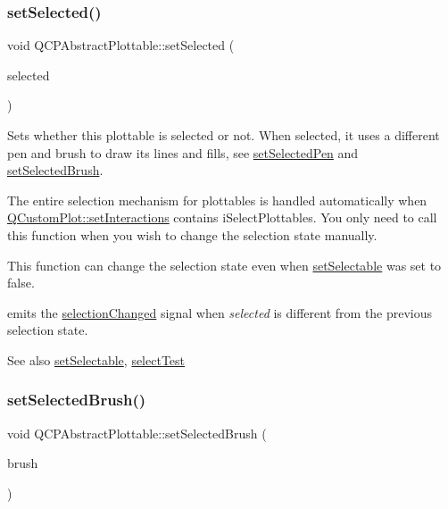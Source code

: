 \subsubsection{\texorpdfstring{set\+Selected()}{setSelected()}}
{\footnotesize\ttfamily void Q\+C\+P\+Abstract\+Plottable\+::set\+Selected (\begin{DoxyParamCaption}\item[{bool}]{selected }\end{DoxyParamCaption})}

Sets whether this plottable is selected or not. When selected, it uses a different pen and brush to draw its lines and fills, see \hyperlink{class_q_c_p_abstract_plottable_a6911603cad23ab0469b108224517516f}{set\+Selected\+Pen} and \hyperlink{class_q_c_p_abstract_plottable_ae8c816874089f7a44001e8618e81a9dc}{set\+Selected\+Brush}.

The entire selection mechanism for plottables is handled automatically when \hyperlink{class_q_custom_plot_a5ee1e2f6ae27419deca53e75907c27e5}{Q\+Custom\+Plot\+::set\+Interactions} contains i\+Select\+Plottables. You only need to call this function when you wish to change the selection state manually.

This function can change the selection state even when \hyperlink{class_q_c_p_abstract_plottable_a22c69299eb5569e0f6bf084877a37dc4}{set\+Selectable} was set to false.

emits the \hyperlink{class_q_c_p_abstract_plottable_a3af66432b1dca93b28e00e78a8c7c1d9}{selection\+Changed} signal when {\itshape selected} is different from the previous selection state.

\begin{DoxySeeAlso}{See also}
\hyperlink{class_q_c_p_abstract_plottable_a22c69299eb5569e0f6bf084877a37dc4}{set\+Selectable}, \hyperlink{class_q_c_p_abstract_plottable_a38efe9641d972992a3d44204bc80ec1d}{select\+Test} 
\end{DoxySeeAlso}
\hypertarget{class_q_c_p_abstract_plottable_ae8c816874089f7a44001e8618e81a9dc}{}\label{class_q_c_p_abstract_plottable_ae8c816874089f7a44001e8618e81a9dc} 
\subsubsection{\texorpdfstring{set\+Selected\+Brush()}{setSelectedBrush()}}
{\footnotesize\ttfamily void Q\+C\+P\+Abstract\+Plottable\+::set\+Selected\+Brush (\begin{DoxyParamCaption}\item[{const Q\+Brush \&}]{brush }\end{DoxyParamCaption})}

